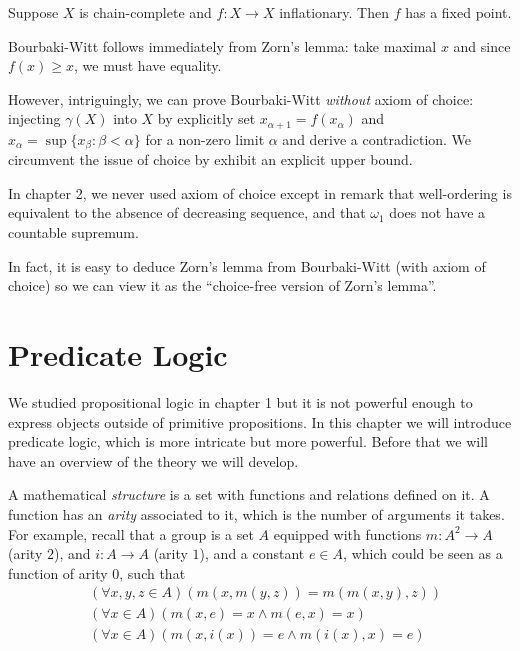 \documentclass[a4paper]{article}
\begin{document}
\begin{theorem}
  Suppose \(X\) is chain-complete and \(f: X \to X\) inflationary. Then \(f\) has a fixed point.
\end{theorem}

Bourbaki-Witt follows immediately from Zorn's lemma: take maximal \(x\) and since \(f(x) \geq x\), we must have equality.

However, intriguingly, we can prove Bourbaki-Witt \emph{without} axiom of choice: injecting \(\gamma(X)\) into \(X\) by explicitly set \(x_{\alpha + 1} = f(x_\alpha)\) and \(x_\alpha = \sup\{x_\beta: \beta < \alpha\}\) for a non-zero limit \(\alpha\) and derive a contradiction. We circumvent the issue of choice by exhibit an explicit upper bound.

\begin{note}
  In chapter 2, we never used axiom of choice except in remark that well-ordering is equivalent to the absence of decreasing sequence, and that \(\omega_1\) does not have a countable supremum.
\end{note}

In fact, it is easy to deduce Zorn's lemma from Bourbaki-Witt (with axiom of choice) so we can view it as the ``choice-free version of Zorn's lemma''.

\section{Predicate Logic}

We studied propositional logic in chapter 1 but it is not powerful enough to express objects outside of primitive propositions. In this chapter we will introduce predicate logic, which is more intricate but more powerful. Before that we will have an overview of the theory we will develop.

A mathematical \emph{structure} is a set with functions and relations defined on it. A function has an \emph{arity} associated to it, which is the number of arguments it takes. For example, recall that a group is a set \(A\) equipped with functions \(m: A^2 \to A\) (arity \(2\)), and \(i: A \to A\) (arity \(1\)), and a constant \(e \in A\), which could be seen as a function of arity \(0\), such that
\begin{align*}
  & (\forall x, y, z\in A) (m(x, m(y, z)) = m(m(x, y), z)) \\
  & (\forall x \in A) (m(x, e) = x \land m(e, x) = x) \\
  & (\forall x \in A) (m(x, i(x)) = e \land m(i(x), x) = e)
\end{align*}
\end{document}
